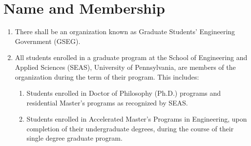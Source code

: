 \chapter{Name and Membership}

\begin{enumerate}[label=\Alph*.]
	\item There shall be an organization known as Graduate Students'
	Engineering Government (GSEG).

	\item All students enrolled in a graduate program at the School
	of Engineering and Applied Sciences (SEAS), University of
	Pennsylvania, are members of the organization during the term of
	their program. This includes: 

	\begin{enumerate}[label=(\roman*)]
		\item Students enrolled in Doctor of Philosophy
		(Ph.D.) programs and residential Master's programs as recognized by SEAS.
		\item Students enrolled in Accelerated Master's Programs in
		Engineering, upon completion of their undergraduate degrees,
		during the course of their single degree graduate program.
	\end{enumerate}
\end{enumerate}
